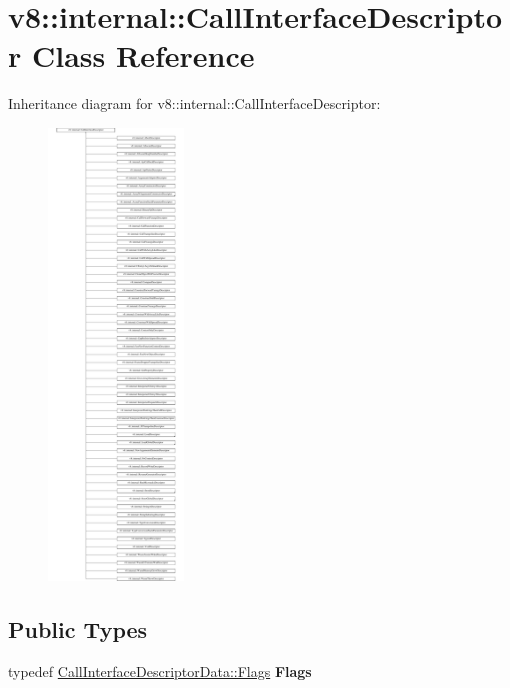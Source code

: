 \hypertarget{classv8_1_1internal_1_1CallInterfaceDescriptor}{}\section{v8\+:\+:internal\+:\+:Call\+Interface\+Descriptor Class Reference}
\label{classv8_1_1internal_1_1CallInterfaceDescriptor}
Inheritance diagram for v8\+:\+:internal\+:\+:Call\+Interface\+Descriptor\+:\begin{figure}[H]
\begin{center}
\leavevmode
\includegraphics[height=12.000000cm]{classv8_1_1internal_1_1CallInterfaceDescriptor}
\end{center}
\end{figure}
\subsection*{Public Types}
\begin{DoxyCompactItemize}
\item 
\mbox{\label{classv8_1_1internal_1_1CallInterfaceDescriptor_aff94bdad2a819df95da92ccd9c6bd7cb}} 
typedef \mbox{\hyperlink{classv8_1_1base_1_1Flags}{Call\+Interface\+Descriptor\+Data\+::\+Flags}} {\bfseries Flags}
\end{DoxyCompactItemize}
